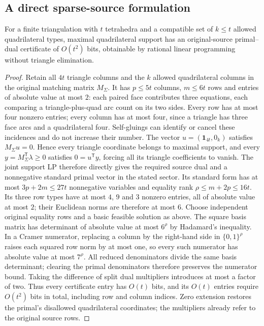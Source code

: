 \subsection{A direct sparse-source formulation}

\begin{corollary}\label{cor:direct-source-support}
For a finite triangulation with $t$ tetrahedra and a compatible set of
$k\leq t$ allowed quadrilateral types, maximal quadrilateral support has
an original-source primal--dual certificate of $O(t^2)$ bits,
obtainable by rational linear programming without triangle elimination.
\end{corollary}
\begin{proof}
Retain all $4t$ triangle columns and the $k$ allowed quadrilateral columns
in the original matching matrix $M_\Sigma$.  It has $p\leq5t$ columns,
$m\leq6t$ rows and entries of absolute value at most $2$: each paired
face contributes three equations, each comparing a triangle-plus-quad
arc count on its two sides.  Every row has at most four nonzero entries;
every column has at most four, since a triangle has three face arcs and
a quadrilateral four.  Self-gluings can identify or cancel these
incidences and do not increase their number.
The vector $u=(\mathbf1_{4t},0_k)$ satisfies
$M_\Sigma u=0$.  Hence every triangle coordinate belongs to maximal
support, and every $y=M_\Sigma^{\mathsf T}\lambda\geq0$ satisfies
$0=u^{\mathsf T}y$, forcing all its triangle coefficients to vanish.
The joint support LP therefore directly gives the required source dual
and a nonnegative standard primal vector in the stated sector.
Its standard form has at most $3p+2m\leq27t$ nonnegative variables and
equality rank $\rho\leq m+2p\leq16t$.  Its three row types have at most
$4$, $9$ and $3$ nonzero entries, all of absolute value at most $2$;
their Euclidean norms are therefore at most $6$.  Choose independent
original equality rows and a basic feasible solution as above.  The
square basis matrix has determinant of absolute value at most $6^\rho$
by Hadamard's inequality.  In a Cramer numerator, replacing a column by
the right-hand side in $\{0,1\}^{\rho}$ raises each squared row norm by
at most one, so every such numerator has absolute value at most $7^\rho$.
All reduced denominators divide the same basis determinant; clearing
the primal denominators therefore preserves the numerator bound.
Taking the difference of split dual multipliers introduces at most a
factor of two.  Thus every certificate entry has $O(t)$ bits, and its
$O(t)$ entries require $O(t^2)$ bits in total, including row and column
indices.  Zero extension restores
the primal's disallowed quadrilateral coordinates; the multipliers
already refer to the original source rows.
\end{proof}

